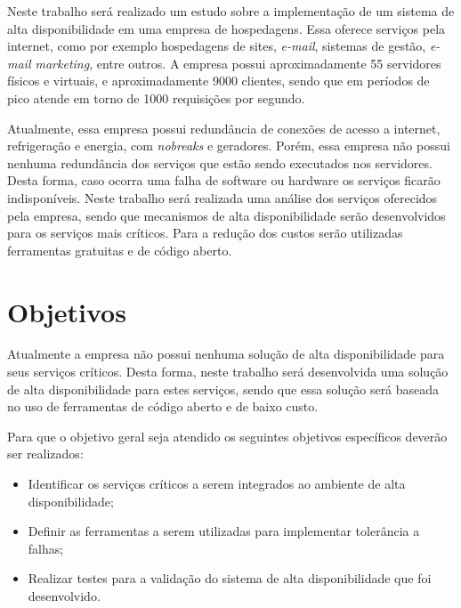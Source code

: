 Neste trabalho será realizado um estudo sobre a implementação de um sistema de alta disponibilidade em uma empresa de hospedagens. 
Essa oferece serviços pela internet, como por exemplo hospedagens de sites, \textit{e-mail}, sistemas de gestão, \textit{e-mail marketing}, 
entre outros. A empresa possui aproximadamente 55 servidores físicos e virtuais, e aproximadamente 9000 clientes, 
sendo que em períodos de pico atende em torno de 1000 requisições por segundo. 

Atualmente, essa empresa possui redundância de conexões de acesso a internet, refrigeração e energia, com \textit{nobreaks} e geradores. 
Porém, essa empresa não possui nenhuma redundância dos serviços que estão sendo executados nos servidores. Desta forma, 
caso ocorra uma falha de software ou hardware os serviços ficarão indisponíveis. Neste trabalho será realizada uma análise dos serviços 
oferecidos pela empresa, sendo que mecanismos de alta disponibilidade serão desenvolvidos para os serviços mais críticos. 
Para a redução dos custos serão utilizadas ferramentas gratuitas e de código aberto.

\section{Objetivos}
Atualmente a empresa não possui nenhuma solução de alta disponibilidade para seus serviços críticos. 
Desta forma, neste trabalho será desenvolvida uma solução de alta disponibilidade para estes serviços, 
sendo que essa solução será baseada no uso de ferramentas de código aberto e de baixo custo.

Para que o objetivo geral seja atendido os seguintes objetivos específicos deverão ser realizados:

\begin{itemize}
\item Identificar os serviços críticos a serem integrados ao ambiente de alta disponibilidade;
\item Definir as ferramentas a serem utilizadas para implementar tolerância a falhas;
\item Realizar testes para a validação do sistema de alta disponibilidade que foi desenvolvido.
\end{itemize}

